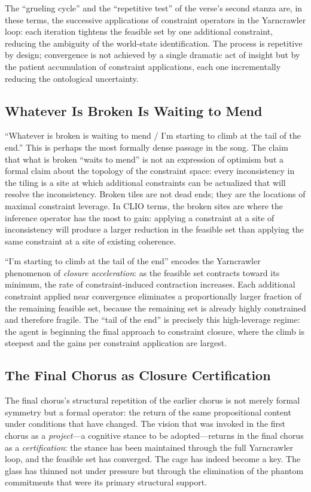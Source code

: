\documentclass[12pt, a4paper]{article}
\begin{document}
The ``grueling cycle'' and the ``repetitive test'' of the verse's second stanza are, in these terms, the successive applications of constraint operators in the Yarncrawler loop: each iteration tightens the feasible set by one additional constraint, reducing the ambiguity of the world-state identification. The process is repetitive by design; convergence is not achieved by a single dramatic act of insight but by the patient accumulation of constraint applications, each one incrementally reducing the ontological uncertainty.

\subsection{Whatever Is Broken Is Waiting to Mend}

``Whatever is broken is waiting to mend / I'm starting to climb at the tail of the end.'' This is perhaps the most formally dense passage in the song. The claim that what is broken ``waits to mend'' is not an expression of optimism but a formal claim about the topology of the constraint space: every inconsistency in the tiling is a site at which additional constraints can be actualized that will resolve the inconsistency. Broken tiles are not dead ends; they are the locations of maximal constraint leverage. In CLIO terms, the broken sites are where the inference operator has the most to gain: applying a constraint at a site of inconsistency will produce a larger reduction in the feasible set than applying the same constraint at a site of existing coherence.

``I'm starting to climb at the tail of the end'' encodes the Yarncrawler phenomenon of \textit{closure acceleration}: as the feasible set contracts toward its minimum, the rate of constraint-induced contraction increases. Each additional constraint applied near convergence eliminates a proportionally larger fraction of the remaining feasible set, because the remaining set is already highly constrained and therefore fragile. The ``tail of the end'' is precisely this high-leverage regime: the agent is beginning the final approach to constraint closure, where the climb is steepest and the gains per constraint application are largest.

\subsection{The Final Chorus as Closure Certification}

The final chorus's structural repetition of the earlier chorus is not merely formal symmetry but a formal operator: the return of the same propositional content under conditions that have changed. The vision that was invoked in the first chorus as a \textit{project}---a cognitive stance to be adopted---returns in the final chorus as a \textit{certification}: the stance has been maintained through the full Yarncrawler loop, and the feasible set has converged. The cage has indeed become a key. The glass has thinned not under pressure but through the elimination of the phantom commitments that were its primary structural support.
\end{document}
